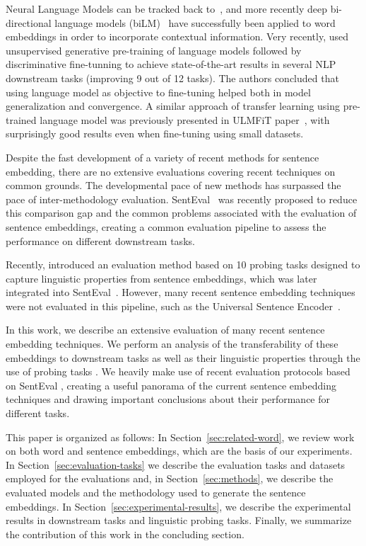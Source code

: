 \documentclass{article}
\begin{document}
Neural Language Models can be tracked back to~\cite{Bengio2003}, and more recently deep bi-directional language models (biLM)~\cite{peters2018deep} have successfully been applied to word embeddings in order to incorporate contextual information. Very recently, \cite{radford2018unsupervised} used unsupervised generative pre-training of language models followed by discriminative fine-tunning to achieve state-of-the-art results in several NLP downstream tasks (improving 9 out of 12 tasks). The authors concluded that using language model as objective to fine-tuning helped both in model generalization and convergence. A similar approach of transfer learning using pre-trained language model was previously presented in ULMFiT paper~\cite{DBLP:journals/corr/abs-1801-06146}, with surprisingly good results even when fine-tuning using small datasets. 

Despite the fast development of a variety of recent methods for sentence embedding, there are no extensive evaluations covering recent techniques on common grounds. The developmental pace of new methods has surpassed the pace of inter-methodology evaluation. SentEval~\cite{conneau2018senteval} was recently proposed to reduce this comparison gap and the common problems associated with the evaluation of sentence embeddings, creating a common evaluation pipeline to assess the performance on different downstream tasks.

Recently, \cite{conneau2018you} introduced an evaluation method based on 10 probing tasks designed to capture linguistic properties from sentence embeddings, which was later integrated into SentEval~\cite{conneau2018senteval}. However, many recent sentence embedding techniques were not evaluated in this pipeline, such as the Universal Sentence Encoder~\cite{DBLP:journals/corr/abs-1803-11175}.

In this work, we describe an extensive evaluation of many recent sentence embedding techniques. We perform an analysis of the transferability of these embeddings to downstream tasks as well as their linguistic properties through the use of probing tasks \cite{conneau2018you}. We heavily make use of recent evaluation protocols based on SentEval \cite{conneau2018senteval}, creating a useful panorama of the current sentence embedding techniques and drawing important conclusions about their performance for different tasks.

This paper is organized as follows: In Section~\ref{sec:related-word}, we review work on both word and sentence embeddings, which are the basis of our experiments. In Section~\ref{sec:evaluation-tasks} we describe the evaluation tasks and datasets employed for the evaluations and, in Section~\ref{sec:methods}, we describe the evaluated models and the methodology used to generate the sentence embeddings. In Section~\ref{sec:experimental-results}, we describe the experimental results in downstream tasks and linguistic probing tasks. Finally, we summarize the contribution of this work in the concluding section.
\end{document}
